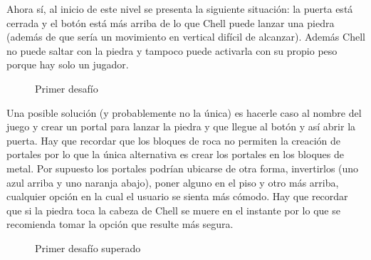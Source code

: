 \documentclass[a4paper]{article}
\begin{document}
Ahora sí, al inicio de este nivel se presenta la siguiente situación: la puerta está cerrada y el botón está más arriba de lo que Chell puede lanzar una piedra (además de que sería un movimiento en vertical difícil de alcanzar). Además Chell no puede saltar con la piedra y tampoco puede activarla con su propio peso porque hay solo un jugador.

\begin{figure}[!h]
	\caption{Primer desafío}
	\label{fig:diagrama4}
\end{figure}

Una posible solución (y probablemente no la única) es hacerle caso al nombre del juego y crear un portal para lanzar la piedra y que llegue al botón y así abrir la puerta. Hay que recordar que los bloques de roca no permiten la creación de portales por lo que la única alternativa es crear los portales en los bloques de metal. Por supuesto los portales podrían ubicarse de otra forma, invertirlos (uno azul arriba y uno naranja abajo), poner alguno en el piso y otro más arriba, cualquier opción en la cual el usuario se sienta más cómodo. Hay que recordar que si la piedra toca la cabeza de Chell se muere en el instante por lo que se recomienda tomar la opción que resulte más segura.

\begin{figure}[!h]
	\caption{Primer desafío superado}
	\label{fig:diagrama5}
\end{figure}
\end{document}
